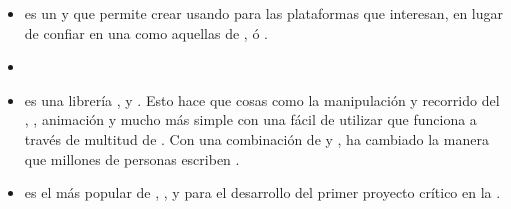 \begin{itemize}
		\item
			\textbf{\phonegapNAME} es un \frameworkPC \freePC y \openSourcePC que permite crear \appsINT \mobileINT usando \webINT \apisAS para las plataformas que interesan, en lugar de confiar en una \apisAS \platformSpecificCPT como aquellas de \iosNAME, \windowsPhoneNAME ó \androidNAME \cite{online_technology_phonegap_mobile_app_plataforms}.

		\item \textbf{\extjsNAME}

		\item
			\textbf{\jqueryNAME} es una librería \javaScriptNAME \fastQA, \smallQA y \featureRichQA. Esto hace que cosas como la manipulación y recorrido del \htmlDocumentINT, \eventHandlingPL, animación y \ajaxNAME mucho más simple con una \apisAS fácil de utilizar que funciona a través de multitud de \browsersINT. Con una combinación de \versatilityQA y \extensibilityQA, \jqueryNAME ha cambiado la manera que millones de personas escriben \javaScriptNAME \cite{online_technology_jquery_officialSite}.
		
		\item \textbf{\bootstrap} es el \frameworkPC más popular de \htmlNAME, \cssNAME, y \javaScriptNAME para el desarrollo del primer proyecto \mobileINT crítico en la \webINT \cite{technology_bootstrap}.
	\end{itemize}

